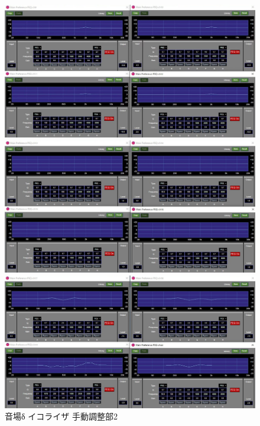 \documentclass[11pt,a4j]{jreport}
\begin{document}
\begin{figure}[H]
  \begin{minipage}[b]{.5\linewidth}
    \centering
    \includegraphics[width=.9\linewidth]{images/experimentField/afcParameters/04delta/05manualEQ8.jpg}
  \end{minipage}%
  \begin{minipage}[b]{.5\linewidth}
    \centering
    \includegraphics[width=.9\linewidth]{images/experimentField/afcParameters/04delta/05manualEQ9.jpg}
  \end{minipage}

  \begin{minipage}[b]{1\linewidth}
    \centering
    \includegraphics[width=.45\linewidth]{images/experimentField/afcParameters/04delta/05manualEQ10.jpg}
  \end{minipage}

  \centering
  \caption{音場δ イコライザ 手動調整部2}
  \label{fig:deltaイコライザ手動調整部2}
\end{figure}



\clearpage


\end{document}
